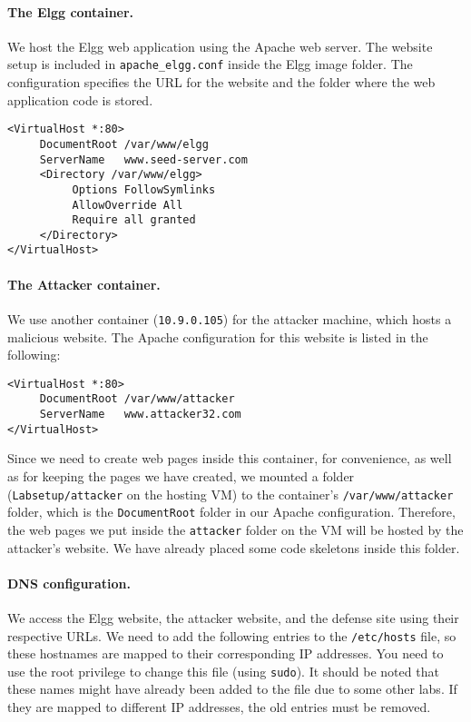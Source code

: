 \vspace{0.1in}
\paragraph{The Elgg container.}
We host the Elgg web application using the Apache web server.
The website setup is included in
\texttt{apache\_elgg.conf} inside the Elgg image folder.
The configuration specifies the URL for the website and
the folder where the web application code is stored.

\begin{lstlisting}
<VirtualHost *:80>
     DocumentRoot /var/www/elgg
     ServerName   www.seed-server.com
     <Directory /var/www/elgg>
          Options FollowSymlinks
          AllowOverride All
          Require all granted
     </Directory>
</VirtualHost>
\end{lstlisting}

\paragraph{The Attacker container.}
We use another container (\texttt{10.9.0.105}) for the 
attacker machine, which hosts a malicious website. 
The Apache configuration for this website is listed
in the following:

\begin{lstlisting}
<VirtualHost *:80>
     DocumentRoot /var/www/attacker
     ServerName   www.attacker32.com
</VirtualHost>
\end{lstlisting}
 
Since we need to create web pages inside this container,
for convenience, as well as for keeping the pages we have created, 
we mounted a folder (\texttt{Labsetup/attacker} on the 
hosting VM) to the container's \texttt{/var/www/attacker}
folder, which is the \texttt{DocumentRoot} folder in our Apache
configuration. Therefore, the web pages we 
put inside the \texttt{attacker} folder on the VM
will be hosted by the attacker's website. 
We have already placed some code skeletons inside 
this folder. 


\paragraph{DNS configuration.}
We access the Elgg website, the attacker 
website, and the defense site using their respective URLs. 
We need to add the following entries to the
\texttt{/etc/hosts} file, so these hostnames are mapped to
their corresponding IP addresses.
You need to use the root privilege to
change this file (using \texttt{sudo}). It should be noted 
that these names might have already been added to the file due to
some other labs. If they are mapped to different IP addresses,
the old entries must be removed. 

